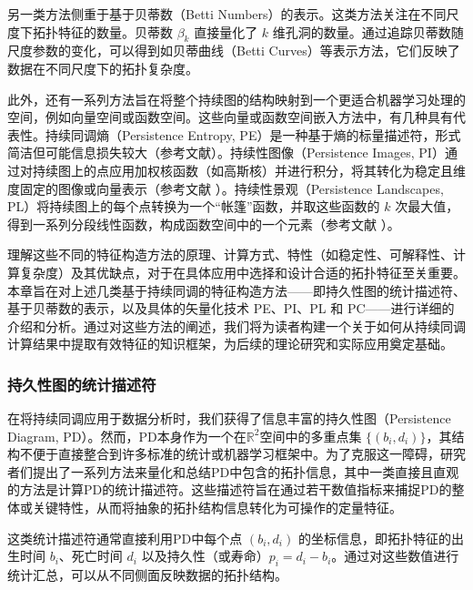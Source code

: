 另一类方法侧重于基于贝蒂数（Betti Numbers）的表示。这类方法关注在不同尺度下拓扑特征的数量。贝蒂数 $\beta_k$ 直接量化了 $k$ 维孔洞的数量。通过追踪贝蒂数随尺度参数的变化，可以得到如贝蒂曲线（Betti Curves）等表示方法，它们反映了数据在不同尺度下的拓扑复杂度。

此外，还有一系列方法旨在将整个持续图的结构映射到一个更适合机器学习处理的空间，例如向量空间或函数空间。这些向量或函数空间嵌入方法中，有几种具有代表性。持续同调熵（Persistence Entropy, PE）是一种基于熵的标量描述符，形式简洁但可能信息损失较大（参考文献\cite{atienza2020stability}）。持续性图像（Persistence Images, PI）通过对持续图上的点应用加权核函数（如高斯核）并进行积分，将其转化为稳定且维度固定的图像或向量表示（参考文献\cite{adams2017persistence} ）。持续性景观（Persistence Landscapes, PL）将持续图上的每个点转换为一个“帐篷”函数，并取这些函数的 $k$ 次最大值，得到一系列分段线性函数，构成函数空间中的一个元素（参考文献 ）。

理解这些不同的特征构造方法的原理、计算方式、特性（如稳定性、可解释性、计算复杂度）及其优缺点，对于在具体应用中选择和设计合适的拓扑特征至关重要。本章旨在对上述几类基于持续同调的特征构造方法——即持久性图的统计描述符、基于贝蒂数的表示，以及具体的矢量化技术 PE、PI、PL 和 PC——进行详细的介绍和分析。通过对这些方法的阐述，我们将为读者构建一个关于如何从持续同调计算结果中提取有效特征的知识框架，为后续的理论研究和实际应用奠定基础。

        \subsubsection{持久性图的统计描述符}
            \label{sec:pd_stats}
            在将持续同调应用于数据分析时，我们获得了信息丰富的持久性图（Persistence Diagram, PD）。然而，PD本身作为一个在$\mathbb{R}^2$空间中的多重点集 $\{(b_i, d_i)\}$，其结构不便于直接整合到许多标准的统计或机器学习框架中。为了克服这一障碍，研究者们提出了一系列方法来量化和总结PD中包含的拓扑信息，其中一类直接且直观的方法是计算PD的统计描述符。这些描述符旨在通过若干数值指标来捕捉PD的整体或关键特性，从而将抽象的拓扑结构信息转化为可操作的定量特征。

            这类统计描述符通常直接利用PD中每个点 $(b_i, d_i)$ 的坐标信息，即拓扑特征的出生时间 $b_i$、死亡时间 $d_i$ 以及持久性（或寿命）$p_i = d_i - b_i$。通过对这些数值进行统计汇总，可以从不同侧面反映数据的拓扑结构。
            

